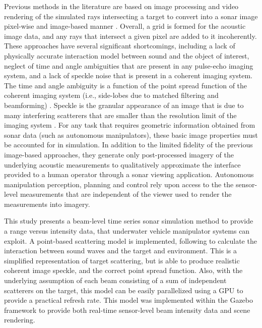 \documentclass[utf8]{frontiersSCNS} %
\begin{document}
Previous methods in the literature are based on image processing and video rendering of the simulated rays intersecting a target to convert into a sonar image pixel-wise and image-based manner \citep{demarco15computationally, cerqueira17novel, cerqueira20rasterized}. Overall, a grid is formed for the acoustic image data, and any rays that intersect a given pixel are added to it incoherently. These approaches have several significant shortcomings, including a lack of physically accurate interaction model between sound and the object of interest, neglect of time and angle ambiguities that are present in any pulse-echo imaging system, and a lack of speckle noise that is present in a coherent imaging system. The time and angle ambiguity is a function of the point spread function of the coherent imaging system (i.e., side-lobes due to matched filtering and beamforming) \cite{Trees1971_DETMT_volIII}. Speckle is the granular appearance of an image that is due to many interfering scatterers that are smaller than the resolution limit of the imaging system \citep{goodman2015statistical}. For any task that requires geometric information obtained from sonar data (such as autonomous manipulators), these basic image properties must be accounted for in simulation. In addition to the limited fidelity of the previous image-based approaches, they generate only post-processed imagery of the underlying acoustic measurements to qualitatively approximate the interface provided to a human operator through a sonar viewing application.  Autonomous manipulation perception, planning and control rely upon access to the the sensor-level measurements that are independent of the viewer used to render the measurements into imagery. 

This study presents a beam-level time series sonar simulation method to provide a range versus intensity data, that underwater vehicle manipulator systems can exploit. A point-based scattering model is implemented, following \cite{brown17point} to calculate the interaction between sound waves and the target and environment. This is a simplified representation of target scattering, but is able to produce realistic coherent image speckle, and the correct point spread function. Also, with the underlying assumption of each beam consisting of a sum of independent scatterers on the target, this model can be easily parallelized using a GPU to provide a practical refresh rate. This model was implemented within the Gazebo framework to provide both real-time sensor-level beam intensity data and scene rendering.
\end{document}
